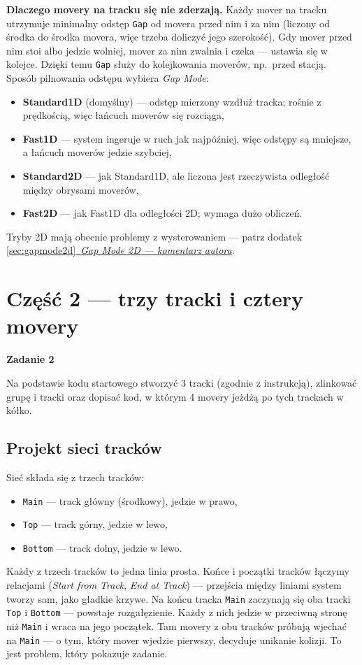 \documentclass[11pt,a4paper]{report}
\newcommand{\podrozdzial}[1]{\subsection*{#1}\addcontentsline{toc}{subsection}{#1}}
\newcommand{\zadanie}[2]{%
  \begin{tcolorbox}[beckbox,colback=bkwarn,borderline west={3pt}{0pt}{bkwarnbd}]
  \textbf{\color{bkorange}#1}\par #2
  \end{tcolorbox}}
\begin{document}
\textbf{Dlaczego movery na tracku się nie zderzają.} Każdy mover na tracku utrzymuje minimalny odstęp \texttt{Gap} od movera przed nim i za nim (liczony od środka do środka movera, więc trzeba doliczyć jego szerokość). Gdy mover przed nim stoi albo jedzie wolniej, mover za nim zwalnia i czeka --- ustawia się w kolejce. Dzięki temu \texttt{Gap} służy do kolejkowania moverów, np.\ przed stacją. Sposób pilnowania odstępu wybiera \textit{Gap Mode}:
\begin{itemize}
  \item \textbf{Standard1D} (domyślny) --- odstęp mierzony wzdłuż tracka; rośnie z prędkością, więc łańcuch moverów się rozciąga,
  \item \textbf{Fast1D} --- system ingeruje w ruch jak najpóźniej, więc odstępy są mniejsze, a łańcuch moverów jedzie szybciej,
  \item \textbf{Standard2D} --- jak Standard1D, ale liczona jest rzeczywista odległość między obrysami moverów,
  \item \textbf{Fast2D} --- jak Fast1D dla odległości 2D; wymaga dużo obliczeń.
\end{itemize}
Tryby 2D mają obecnie problemy z wysterowaniem --- patrz dodatek \hyperref[sec:gapmode2d]{\ref*{sec:gapmode2d}~\textit{Gap Mode 2D --- komentarz autora}}.

\section{Część 2 --- trzy tracki i cztery movery}\label{sec:track-kod}
\zadanie{Zadanie 2}{Na podstawie kodu startowego stworzyć 3 tracki (zgodnie z instrukcją), zlinkować grupę i tracki oraz dopisać kod, w którym 4 movery jeżdżą po tych trackach w kółko.}

\podrozdzial{Projekt sieci tracków}
Sieć składa się z trzech tracków:
\begin{itemize}
  \item \texttt{Main} --- track główny (środkowy), jedzie w prawo,
  \item \texttt{Top} --- track górny, jedzie w lewo,
  \item \texttt{Bottom} --- track dolny, jedzie w lewo.
\end{itemize}
Każdy z trzech tracków to jedna linia prosta. Końce i początki tracków łączymy relacjami (\textit{Start from Track}, \textit{End at Track}) --- przejścia między liniami system tworzy sam, jako gładkie krzywe. Na końcu tracka \texttt{Main} zaczynają się oba tracki \texttt{Top} i \texttt{Bottom} --- powstaje rozgałęzienie. Każdy z nich jedzie w przeciwną stronę niż \texttt{Main} i wraca na jego początek. Tam movery z obu tracków próbują wjechać na \texttt{Main} --- o tym, który mover wjedzie pierwszy, decyduje unikanie kolizji. To jest problem, który pokazuje zadanie.
\end{document}
